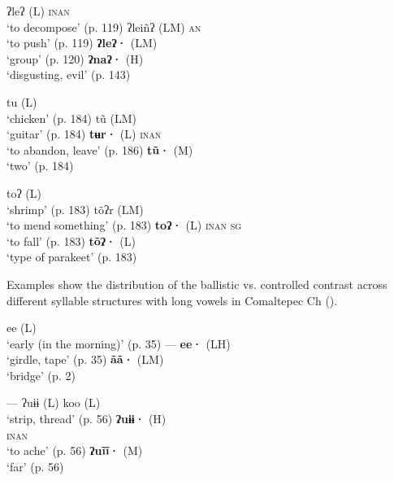 \documentclass[output=paper]{langscibook}
\begin{document}
\ea
{}
     {ʔleʔ (L) \textsc{inan}\\
          \glt ‘to decompose’ (p. 119)
     }
     {ʔleiñʔ (LM) \textsc{an}\\
          \glt ‘to push’ (p. 119)
     }
     {\textbf{ʔleʔ·} (LM)\\
          \glt ‘group’ (p. 120)
     }
     {\textbf{ʔnaʔ·} (H)\\
          \glt ‘disgusting, evil’ (p. 143)
     }
\z

\ea
{}
          {tu (L)\\
               \glt ‘chicken’ (p. 184)
          }
          {tũ (LM) \\
               \glt ‘guitar’   (p. 184)
          }
          {\textbf{tʉr·} (L) \textsc{inan}\\
               \glt ‘to abandon, leave’ (p. 186)
          }
          {\textbf{tũ·} (M)\\
               \glt ‘two’  (p. 184)
          }
\z

\newpage
\ea
{}
     {toʔ (L)\\
          \glt ‘shrimp’ (p. 183)
     }
     {tõʔr (LM)\\
          \glt ‘to mend something’ (p. 183)
     }
     {\textbf{toʔ·} (L) \textsc{inan} \textsc{sg} \\
               \glt ‘to fall’ (p. 183)
     }
     {\textbf{tõʔ·} (L) \\
          \glt ‘type of parakeet’ (p. 183)
     }
\z

Examples  show the distribution of the ballistic vs. controlled contrast across different syllable structures with long vowels in Comaltepec Ch (\citealt{AndersenEtAl2021}).

\ea
{}
     {ee (L)\\
               \glt ‘early (in the morning)’ (p. 35)
     }
     {---}
     {\textbf{ee·} (LH)\\
          \glt ‘girdle, tape’ (p. 35)
     }
     {\textbf{ãã·} (LM) \\
          \glt ‘bridge’ (p. 2)
     }
\z

\ea
{}
     {---}
     {ʔuɨɨ (L) koo (L)\\
          \glt ‘strip, thread’ (p. 56)
     }
     {\textbf{ʔuɨɨ·} (H)\\
     \textsc{inan} \\
          \glt ‘to ache’ (p. 56)
     }
     {\textbf{ʔuĩĩ·} (M)\\
          \glt ‘far’ (p. 56)
     }
\z
\end{document}
